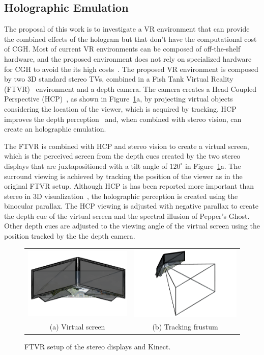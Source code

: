 \subsection {Holographic Emulation}
\label{sec.holographic_emulation}

The proposal of this work is to investigate a VR environment that can provide the combined effects of the hologram but that don't have the computational cost of CGH. Most of current VR environments can be composed of off-the-shelf hardware, and the proposed environment does not rely on specialized hardware for CGH to avoid the its high costs~\cite{fournier2004}. The proposed VR environment is composed by two 3D standard stereo TVs, combined in a Fish Tank Virtual Reality (FTVR)~\cite{Ware1993} environment and a depth camera. The camera creates a Head Coupled Perspective (HCP)~\cite{okoshi2012}, as shown in Figure~\ref{fig.tv_setup}a, by projecting virtual objects considering the location of the viewer, which is acquired by tracking. HCP improves the depth perception~\cite{li2012} and, when combined with stereo vision, can create an holographic emulation. 

The FTVR is combined with HCP and stereo vision to create a virtual screen, which is the perceived screen from the depth cues created by the two stereo displays that are juxtapositioned with a tilt angle of $120^{\circ}$ in Figure~\ref{fig.tv_setup}a. The surround viewing is achieved by tracking the position of the viewer as in the original FTVR setup. Although HCP is has been reported more important than stereo in 3D visualization~\cite{Ware1993}, the holographic perception is created using the binocular parallax. The HCP viewing is adjusted with negative parallax to create the depth cue of the virtual screen and the spectral illusion of Pepper's Ghost. Other depth cues are adjusted to the viewing angle of the virtual screen using the position tracked by the the depth camera.

\begin{figure}[!hbt]
\centering
\begin{tabular}{cc}
\includegraphics[width=0.4\linewidth,keepaspectratio=true]{figs/labsetup_01.png}&
\includegraphics[width=0.4\linewidth,keepaspectratio=true]{figs/labsetup_02.png}\\
(a) Virtual screen & 
(b) Tracking frustum
\end{tabular}
\caption{FTVR setup of the stereo displays and Kinect.}
\label{fig.tv_setup}
\end{figure}

